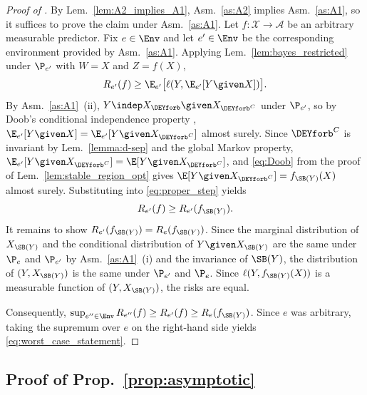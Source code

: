 \begin{proof}[Proof of ]
By Lem.~\ref{lem:A2_implies_A1}, Asm.~\ref{as:A2} implies
Asm.~\ref{as:A1}, so it suffices to prove the claim under
Asm.~\ref{as:A1}. Let $f\colon \mathcal{X} \to \mathcal{A}$ be
an arbitrary measurable predictor. Fix $e \in \Env$ and let
$e' \in \Env$ be the corresponding environment provided by Asm.~\ref{as:A1}.
Applying Lem.~\ref{lem:bayes_restricted} under $\P_{e'}$ with $W = X$
and $Z = f(X)$,
\begin{equation} \label{eq:proper_step}
  R_{e'}(f)
   \geq 
  \E_{e'} \bigl[\ell(Y,  \E_{e'}[Y \given X])\bigr].
\end{equation}
By Asm.~\ref{as:A1}~(ii),
$Y \indep X_{\DEYforb} \given X_{\DEYforb^C}$ under $\P_{e'}$, so by Doob's conditional independence property
\citep[Thm.~8.9]{kallenbergFoundationsModernProbability2021},
$\E_{e'}[Y \given X] = \E_{e'}[Y \given X_{\DEYforb^C}]$ almost surely. Since
$\DEYforb^C$ is invariant by Lem.~\ref{lemma:d-sep} and the global Markov property,
$\E_{e'}[Y \given X_{\DEYforb^C}] = \E[Y \given X_{\DEYforb^C}]$, and
\eqref{eq:Doob} from the proof of Lem.~\ref{lem:stable_region_opt} gives $\E[Y \given X_{\DEYforb^C}] = f_{\SB(Y)}(X)$ almost surely.
Substituting into \eqref{eq:proper_step} yields
$$
  R_{e'}(f)  \geq  R_{e'}(f_{\SB(Y)}).
$$
It remains to show $R_{e'}(f_{\SB(Y)}) = R_e(f_{\SB(Y)})$. Since the marginal distribution of $X_{\SB(Y)}$ and the conditional distribution of $Y \given X_{\SB(Y)}$ are the same under $\P_e$ and $\P_{e'}$ by Asm.~\ref{as:A1}~(i) and the invariance of $\SB(Y)$, the distribution of $(Y, X_{\SB(Y)})$ is the same under $\P_{e'}$ and $\P_e$. Since $\ell(Y, f_{\SB(Y)}(X))$ is a measurable function of
$(Y, X_{\SB(Y)})$, the risks are equal.

Consequently, $\sup_{e'' \in \Env} R_{e''}(f) \geq R_{e'}(f) \geq R_e(f_{\SB(Y)})$.
Since $e$ was arbitrary, taking the supremum over $e$ on the
right-hand side yields \eqref{eq:worst_case_statement}. 
\end{proof}



\subsection{Proof of Prop.~\ref{prop:asymptotic}}

